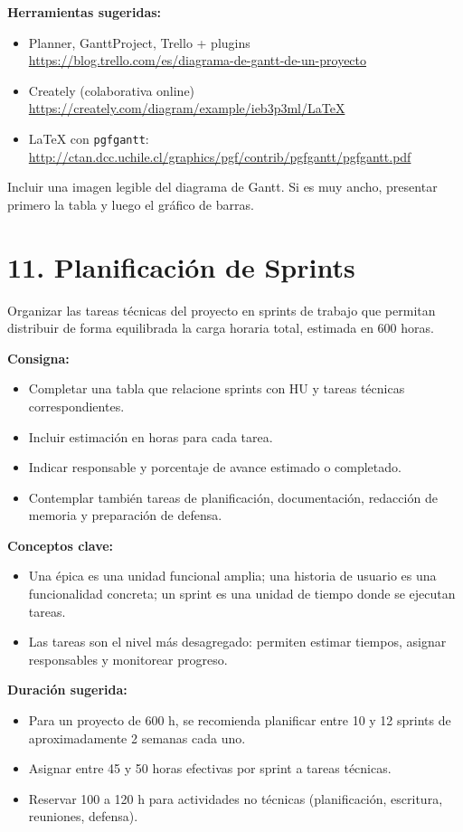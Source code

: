 \documentclass[
11pt, %
]{charter}
\begin{document}
\textbf{Herramientas sugeridas:}
\begin{itemize}
  \item Planner, GanttProject, Trello + plugins\\
  \url{https://blog.trello.com/es/diagrama-de-gantt-de-un-proyecto}
  \item Creately (colaborativa online)\\
  \url{https://creately.com/diagram/example/ieb3p3ml/LaTeX}
  \item LaTeX con \texttt{pgfgantt}:\\
  \url{http://ctan.dcc.uchile.cl/graphics/pgf/contrib/pgfgantt/pgfgantt.pdf}
\end{itemize}

Incluir una imagen legible del diagrama de Gantt. Si es muy ancho, presentar primero la tabla y luego el gráfico de barras.

\section{11. Planificación de Sprints}

Organizar las tareas técnicas del proyecto en sprints de trabajo que permitan distribuir de forma equilibrada la carga horaria total, estimada en 600 horas.

\textbf{Consigna:}
\begin{itemize}
  \item Completar una tabla que relacione sprints con HU y tareas técnicas correspondientes.
  \item Incluir estimación en horas para cada tarea.
  \item Indicar responsable y porcentaje de avance estimado o completado.
  \item Contemplar también tareas de planificación, documentación, redacción de memoria y preparación de defensa.
\end{itemize}

\textbf{Conceptos clave:}
\begin{itemize}
  \item Una \'{e}pica es una unidad funcional amplia; una historia de usuario es una funcionalidad concreta; un sprint es una unidad de tiempo donde se ejecutan tareas.
  \item Las tareas son el nivel más desagregado: permiten estimar tiempos, asignar responsables y monitorear progreso.
\end{itemize}

\textbf{Duración sugerida:}
\begin{itemize}
  \item Para un proyecto de 600 h, se recomienda planificar entre 10 y 12 sprints de aproximadamente 2 semanas cada uno.
  \item Asignar entre 45 y 50 horas efectivas por sprint a tareas técnicas.
  \item Reservar 100 a 120 h para actividades no técnicas (planificación, escritura, reuniones, defensa).
\end{itemize}
\end{document}
